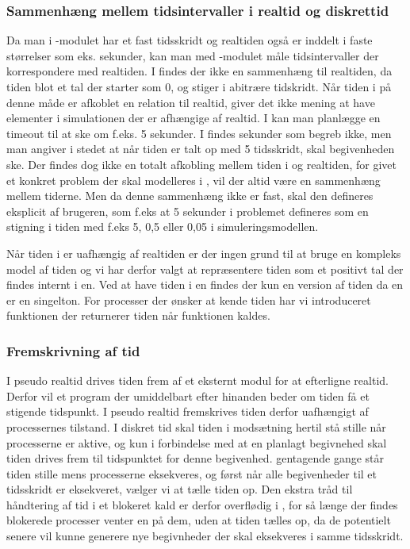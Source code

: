 \subsubsection{Sammenhæng mellem tidsintervaller i realtid og diskrettid}
Da man i -modulet har et fast tidsskridt og
realtiden også er inddelt i faste størrelser
som eks. sekunder, kan man med -modulet måle tidsintervaller der
korrespondere med realtiden. I \des findes der ikke en
sammenhæng til  realtiden, da tiden blot et tal der starter som 0, og stiger
i abitrære tidskridt. Når tiden i \des på denne måde er afkoblet
en relation til realtid, giver det ikke mening at have elementer i simulationen der er afhængige af realtid. 
I \pycsp kan man planlægge en timeout til at ske om f.eks. 5 sekunder. I \des findes sekunder som
begreb ikke, men man  angiver i stedet at når tiden er talt op med 5 tidsskridt, skal
begivenheden ske. Der findes dog ikke en totalt afkobling mellem tiden i \des og realtiden, for givet et konkret problem der skal modelleres i \des, vil der altid være en sammenhæng mellem tiderne. Men da denne sammenhæng ikke er fast, skal den defineres eksplicit af brugeren, som f.eks at 5 sekunder i problemet defineres som en stigning i tiden med f.eks 5, 0,5 eller 0,05 i simuleringsmodellen.

Når tiden i \des er uafhængig af realtiden er der ingen grund til at bruge en kompleks model af tiden og vi har derfor valgt at repræsentere tiden som et positivt tal der findes internt i \sched en. Ved at have tiden i \sched en findes der kun en version af tiden da  \sched en er en singelton. For processer der ønsker at kende tiden har vi
introduceret funktionen  der returnerer tiden når funktionen kaldes. 


\subsubsection{Fremskrivning af tid}

I pseudo realtid drives tiden frem af et eksternt modul for at efterligne realtid. Derfor vil et program der umiddelbart efter hinanden beder om tiden få et stigende  tidspunkt. I pseudo realtid fremskrives tiden derfor uafhængigt af processernes tilstand. I diskret tid skal tiden i modsætning hertil stå stille når processerne er aktive, og kun i forbindelse med at en planlagt begivnehed skal tiden drives frem til tidspunktet for denne begivenhed.
 gentagende gange \des står tiden stille mens processerne eksekveres, og først når alle begivenheder til et tidsskridt er eksekveret, vælger vi at tælle tiden op. Den ekstra tråd til håndtering af tid i et blokeret kald er derfor overflødig i \des, for så længe der findes blokerede processer venter \sched en på dem, uden at tiden tælles op, da de potentielt senere vil kunne  generere nye begivnheder der skal eksekveres i samme tidsskridt.


